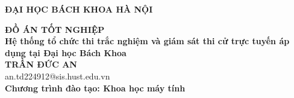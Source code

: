 \documentclass[DoAn.tex]{subfiles}
\begin{document}
\begin{titlepage}
\thispagestyle{empty}
\begin{center}

{\textbf{\large{ĐẠI HỌC BÁCH KHOA HÀ NỘI}}}

\vfill

{\textbf{\huge{ ĐỒ ÁN TỐT NGHIỆP}}}\\[1cm]
\textbf{\Large Hệ thống tổ chức thi trắc nghiệm và giám sát thi cử trực tuyến áp dụng tại Đại học Bách Khoa}\\[1cm]

{\textbf{\large{TRẦN ĐỨC AN}}}\\
{\large{an.td224912@sis.hust.edu.vn}}\\[0.5cm]

{\textbf{\large{Chương trình đào tạo: Khoa học máy tính
}}}\\

\vfill

\begin{table}[H]
\centering
{}
\end{table}
\end{center}

\end{titlepage}
\end{document}
